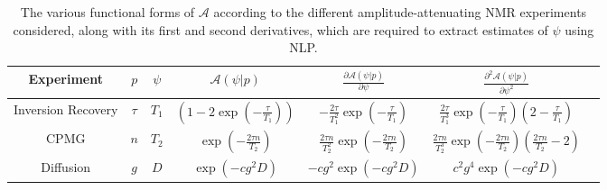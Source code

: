 \begin{table}
    \begin{center}
        \begin{tabular}{ccccccc}
            \hline
            Experiment &
            $p$ &
            $\psi$ &
            $\mathcal{A}(\psi | p)$ &
            $\frac{\partial \mathcal{A}(\psi | p)}{\partial \psi}$ &
            $\frac{\partial^2 \mathcal{A}(\psi | p)}{\partial \psi^2}$ \\ \hline
            Inversion Recovery &
            $\tau$ &
            $T_1$ &
            $\left(1 - 2 \exp \left(-\frac{\tau}{T_{1}}\right)\right)$ &
            $-\frac{2 \tau}{T_1^2} \exp\left(-\frac{\tau}{T_1}\right)$ &
            $\frac{2 \tau}{T_1^3} \exp\left(-\frac{\tau}{T_1}\right)\left(2 - \frac{\tau}{T_1}\right)$\\
            \acs{CPMG} &
            $n$ &
            $T_2$ &
            $\exp\left(-\frac{2 \tau n}{T_2}\right)$ &
            $\frac{2 \tau n}{T_2^2}\exp\left(-\frac{2 \tau n}{T_2}\right)$ &
            $\frac{2 \tau n}{T_2^3}\exp\left(-\frac{2 \tau n}{T_2}\right)
            \left( \frac{2 \tau n}{T_2} - 2 \right)$ \\
            Diffusion &
            $g$ &
            $D$ &
            $\exp\left(-c g^2 D\right)$ &
            $-c g^2 \exp\left(-c g^2 D\right)$ &
            $c^2 g^4 \exp\left(-c g^2 D\right)$ \\
            \hline
       \end{tabular}
       \caption[
           The various functional forms of $\mathcal{A}$ according to the
           different amplitude-attenuating NMR experiments considered.
       ]
       {
           The various functional forms of $\mathcal{A}$ according to the
           different amplitude-attenuating NMR experiments considered, along
           with its first and second derivatives, which are required to extract
           estimates of $\psi$ using \ac{NLP}.
       }
       \label{tab:seq-equations}
    \end{center}
\end{table}

